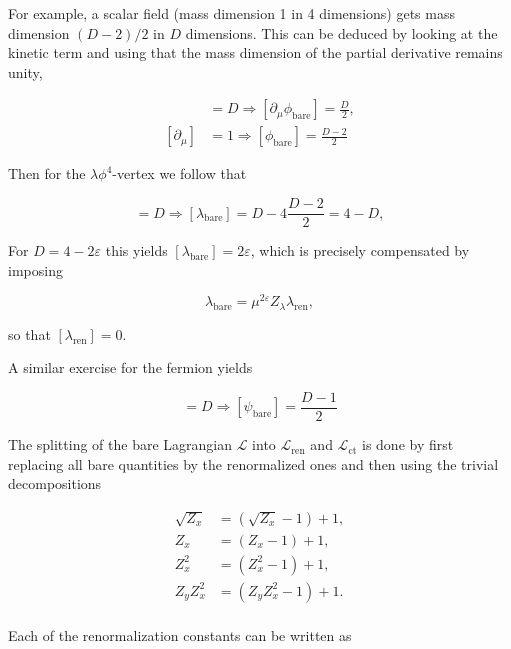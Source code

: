 \documentclass[../FeynCalcManual.tex]{subfiles}
\begin{document}
For example, a scalar field (mass dimension 1 in 4 dimensions) gets mass
dimension \((D-2)/2\) in \(D\) dimensions. This can be deduced by
looking at the kinetic term and using that the mass dimension of the
partial derivative remains unity,

\begin{align*}
[(\partial_\mu \phi_{\textrm{bare}})^2] &= D \Rightarrow [\partial_\mu \phi_{\textrm{bare}}] = \frac{D}{2},  \\
[\partial_\mu] & = 1 \Rightarrow [\phi_{\textrm{bare}}] = \frac{D-2}{2}
\end{align*}

Then for the \(\lambda \phi^4\)-vertex we follow that

\begin{equation}
[\lambda_{\textrm{bare}} \phi_{\textrm{bare}}^4] = D \Rightarrow [\lambda_{\textrm{bare}}] = D - 4 \frac{D-2}{2} = 4 - D,
\end{equation}

For \(D = 4- 2 \varepsilon\) this yields
\([\lambda_{\textrm{bare}}] = 2 \varepsilon\), which is precisely
compensated by imposing

\begin{equation}
\lambda_{\textrm{bare}} =  \mu^{2 \varepsilon} Z_\lambda \lambda_{\textrm{ren}},
\end{equation}

so that \([\lambda_{\textrm{ren}}] = 0\).

A similar exercise for the fermion yields

\begin{equation}
[\bar{\psi}_{\textrm{bare}} i \gamma \cdot \partial \psi_{\textrm{bare}} ] = D \Rightarrow [\psi_{\textrm{bare}}] = \frac{D-1}{2}
\end{equation}

The splitting of the bare Lagrangian \(\mathcal{L}\) into
\(\mathcal{L}_{\textrm{ren}}\) and \(\mathcal{L}_{\textrm{ct}}\) is done
by first replacing all bare quantities by the renormalized ones and then
using the trivial decompositions

\begin{align*}
\sqrt{Z_x} &= (\sqrt{Z_x} - 1) + 1, \\
Z_x &= (Z_x - 1) + 1, \\
Z_x^2 &= (Z_x^2 - 1) + 1, \\
Z_y Z_x^2 &= (Z_y Z_x^2 - 1) + 1. \\
\end{align*}

Each of the renormalization constants can be written as
\end{document}
